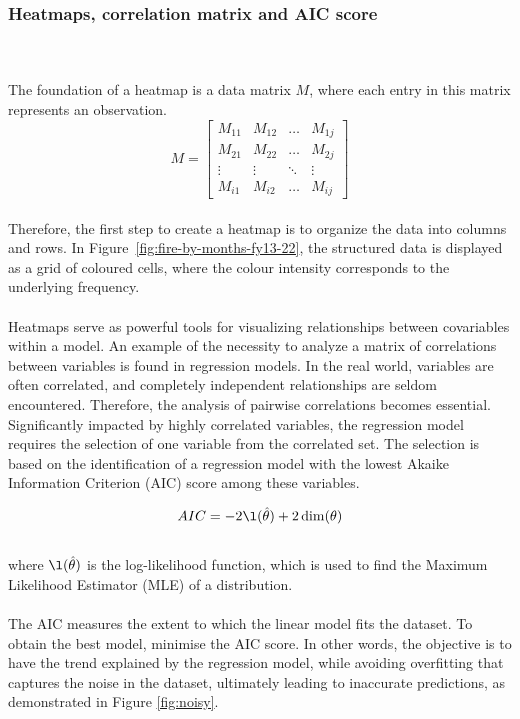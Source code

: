 \documentclass{article}\usepackage[]{graphicx}\usepackage[]{xcolor}
\begin{document}
\subsubsection{Heatmaps, correlation matrix and AIC score}
\\  
\\The foundation of a heatmap is a data matrix $M$, where each entry in this matrix represents an observation.
$$M =
\left[
\begin{array}{cccc}
    M_{11} & M_{12} & \ldots & M_{1j} \\  
    M_{21} & M_{22} & \ldots & M_{2j} \\  
    \vdots & \vdots & \ddots & \vdots \\  
    M_{i1} & M_{i2} & \ldots & M_{ij}
\end{array}
\right]
$$
\\Therefore, the first step to create a heatmap is to organize the data into columns and rows. In Figure~\ref{fig:fire-by-months-fy13-22}, the structured data is displayed as a grid of coloured cells, where the colour intensity corresponds to the underlying frequency.
\\  
\\Heatmaps serve as powerful tools for visualizing relationships between covariables within a model. An example of the necessity to analyze a matrix of correlations between variables is found in regression models. In the real world, variables are often correlated, and completely independent relationships are seldom encountered. Therefore, the analysis of pairwise correlations becomes essential. Significantly impacted by highly correlated variables, the regression model requires the selection of one variable from the correlated set. The selection is based on the identification of a regression model with the lowest Akaike Information Criterion (AIC) score among these variables. 

$$AIC = -2 \l(\hat{\mathbf{\theta}})+2 \dim (\mathbf{\theta})$$
\\where $\l(\hat{\mathbf{\theta}})$ is the log-likelihood function, which is used to find the Maximum Likelihood Estimator (MLE) of a distribution.
\\  
\\The AIC measures the extent to which the linear model fits the dataset. To obtain the best model, minimise the AIC score. In other words, the objective is to have the trend explained by the regression model, while avoiding overfitting that captures the noise in the dataset, ultimately leading to inaccurate predictions, as demonstrated in Figure \ref{fig:noisy}.
\end{document}
